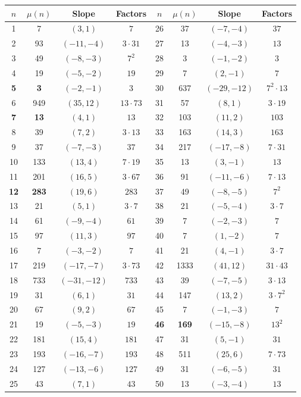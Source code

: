 \documentclass[11pt,a4paper]{article}
\theoremstyle{definition}
\theoremstyle{remark}
\begin{document}
\begin{longtable}{cccc|cccc}
\toprule
$n$ & $\mu(n)$ & Slope & Factors &
$n$ & $\mu(n)$ & Slope & Factors \\
\midrule\endhead
1 & 7 & $(3,1)$ & $7$ &
26 & 37 & $(-7,-4)$ & $37$ \\
2 & 93 & $(-11,-4)$ & $3{\cdot}31$ &
27 & 13 & $(-4,-3)$ & $13$ \\
3 & 49 & $(-8,-3)$ & $7^2$ &
28 & 3 & $(-1,-2)$ & $3$ \\
4 & 19 & $(-5,-2)$ & $19$ &
29 & 7 & $(2,-1)$ & $7$ \\
\textbf{5} & \textbf{3} & $(-2,-1)$ & $3$ &
30 & 637 & $(-29,-12)$ & $7^2{\cdot}13$ \\
6 & 949 & $(35,12)$ & $13{\cdot}73$ &
31 & 57 & $(8,1)$ & $3{\cdot}19$ \\
\textbf{7} & \textbf{13} & $(4,1)$ & $13$ &
32 & 103 & $(11,2)$ & $103$ \\
8 & 39 & $(7,2)$ & $3{\cdot}13$ &
33 & 163 & $(14,3)$ & $163$ \\
9 & 37 & $(-7,-3)$ & $37$ &
34 & 217 & $(-17,-8)$ & $7{\cdot}31$ \\
10 & 133 & $(13,4)$ & $7{\cdot}19$ &
35 & 13 & $(3,-1)$ & $13$ \\
11 & 201 & $(16,5)$ & $3{\cdot}67$ &
36 & 91 & $(-11,-6)$ & $7{\cdot}13$ \\
\textbf{12} & \textbf{283} & $(19,6)$ & $283$ &
37 & 49 & $(-8,-5)$ & $7^2$ \\
13 & 21 & $(5,1)$ & $3{\cdot}7$ &
38 & 21 & $(-5,-4)$ & $3{\cdot}7$ \\
14 & 61 & $(-9,-4)$ & $61$ &
39 & 7 & $(-2,-3)$ & $7$ \\
15 & 97 & $(11,3)$ & $97$ &
40 & 7 & $(1,-2)$ & $7$ \\
16 & 7 & $(-3,-2)$ & $7$ &
41 & 21 & $(4,-1)$ & $3{\cdot}7$ \\
17 & 219 & $(-17,-7)$ & $3{\cdot}73$ &
42 & 1333 & $(41,12)$ & $31{\cdot}43$ \\
18 & 733 & $(-31,-12)$ & $733$ &
43 & 39 & $(-7,-5)$ & $3{\cdot}13$ \\
19 & 31 & $(6,1)$ & $31$ &
44 & 147 & $(13,2)$ & $3{\cdot}7^2$ \\
20 & 67 & $(9,2)$ & $67$ &
45 & 7 & $(-1,-3)$ & $7$ \\
21 & 19 & $(-5,-3)$ & $19$ &
\textbf{46} & \textbf{169} & $(-15,-8)$ & $13^2$ \\
22 & 181 & $(15,4)$ & $181$ &
47 & 31 & $(5,-1)$ & $31$ \\
23 & 193 & $(-16,-7)$ & $193$ &
48 & 511 & $(25,6)$ & $7{\cdot}73$ \\
24 & 127 & $(-13,-6)$ & $127$ &
49 & 31 & $(-6,-5)$ & $31$ \\
25 & 43 & $(7,1)$ & $43$ &
50 & 13 & $(-3,-4)$ & $13$ \\
\bottomrule
\end{longtable}
\label{tab:mu}
\end{document}
